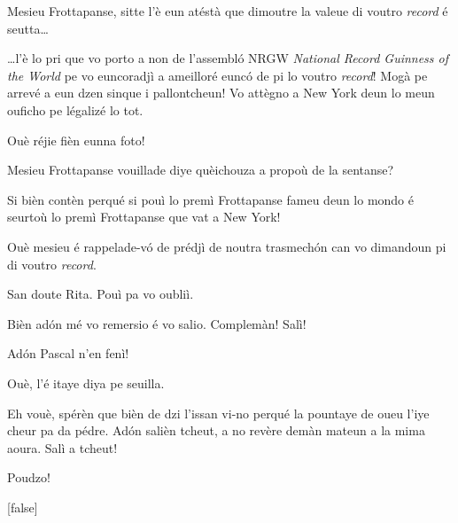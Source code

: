 \begin{drama}
\Tissotspeaks Mesieu Frottapanse, sitte l’è eun atéstà que dimoutre la valeue di voutro \textit{record} é seutta\ldots


\Tissotspeaks \ldots l’è lo pri que vo porto a non de l’assembló NRGW \textit{National Record Guinness of the World} pe vo euncoradjì a ameilloré eunc\'o de pi lo voutro \textit{record}!  Mogà pe arrevé a eun dzen sinque i pallontcheun! Vo attègno a New York deun lo meun ouficho pe légalizé lo tot.

\Ritaspeaks Ouè réjie fièn eunna foto!


\Ritaspeaks Mesieu Frottapanse vouillade diye quèichouza a propoù de la sentanse?

\Cienspeaks Si bièn contèn perqué si pouì lo premì Frottapanse fameu deun lo mondo é seurtoù lo premì Frottapanse que vat a New York!

\Ritaspeaks Ouè mesieu é rappelade-v\'o de prédjì de noutra trasmechón can vo dimandoun pi di voutro \textit{record}.

\Cienspeaks San doute Rita. Pouì pa vo oubliì.

\Ritaspeaks  Bièn ad\'on mé vo remersio é vo salio. Complemàn! Salì!


\Ritaspeaks Adón Pascal n'en fenì!

\Pascalspeaks Ouè, l’é itaye diya pe seuilla.

\Ritaspeaks Eh vouè, spérèn que bièn de dzi l’issan vi-no perqué la pountaye de oueu l’iye cheur pa da pédre. Adón salièn tcheut, a no revère demàn mateun a la mima aoura. Salì a tcheut!

\Pascalspeaks Poudzo!

[false]

\ridocliou

\DeriLeRido


\end{drama}
